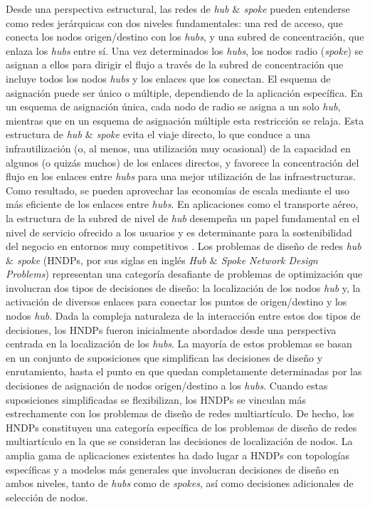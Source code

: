 Desde una perspectiva estructural, las redes de \emph{hub $\&$ spoke} pueden entenderse como redes jerárquicas con dos niveles fundamentales: una red de acceso, que conecta los nodos origen/destino con los \emph{hubs}, y una subred de concentración, que enlaza los \emph{hubs} entre sí.
Una vez determinados los \emph{hubs}, los nodos radio (\emph{spoke}) se asignan a ellos para dirigir el flujo a través de la subred de concentración que incluye todos los nodos \emph{hubs} y los enlaces que los conectan.
El esquema de asignación puede ser único o múltiple, dependiendo de la aplicación específica.
En un esquema de asignación única, cada nodo de radio se asigna a un solo \emph{hub},
mientras que en un esquema de asignación múltiple esta restricción se relaja. Esta estructura
de \emph{hub $\&$ spoke} evita el viaje directo, lo que conduce a una infrautilización (o, al menos,
una utilización muy ocasional) de la capacidad en algunos (o quizás muchos) de los enlaces
directos, y favorece la concentración del flujo en los enlaces entre \emph{hubs} para una mejor utilización de las infraestructuras. Como resultado, se pueden aprovechar las economías de escala
mediante el uso más eficiente de los enlaces entre \emph{hubs}. En aplicaciones como el transporte aéreo, la estructura de la subred de nivel de \emph{hub} desempeña un papel fundamental en el nivel de servicio ofrecido a los usuarios y es determinante para la sostenibilidad del negocio en entornos muy competitivos \cite{belobaba2015global}.
Los problemas de diseño de redes \emph{hub $\&$ spoke} (HNDPs, por sus siglas en inglés \textit{Hub $\&$ Spoke Network Design Problems}) representan una categoría desafiante de problemas de optimización que involucran dos tipos de decisiones de diseño: la localización de los nodos \emph{hub} y, la activación de diversos enlaces para conectar los puntos de origen/destino y los nodos \emph{hub}. Dada la compleja naturaleza de la interacción entre estos dos tipos de decisiones, los HNDPs fueron inicialmente abordados desde una perspectiva centrada en la localización de los \emph{hubs}. La mayoría de estos problemas se basan en un conjunto de suposiciones que simplifican las decisiones de diseño y enrutamiento, hasta el punto en que quedan completamente determinadas por las decisiones de asignación de nodos origen/destino a los \emph{hubs}. Cuando estas suposiciones simplificadas se flexibilizan, los HNDPs se vinculan más estrechamente con los problemas de diseño de redes multiartículo. De hecho, los HNDPs constituyen una categoría específica de los problemas de diseño de redes multiartículo en la que se consideran las decisiones de localización de nodos. La amplia gama de aplicaciones existentes ha dado lugar a HNDPs con topologías específicas y a modelos más generales que involucran decisiones de diseño en ambos niveles, tanto de \emph{hubs} como de \emph{spokes}, así como decisiones adicionales de selección de nodos.
